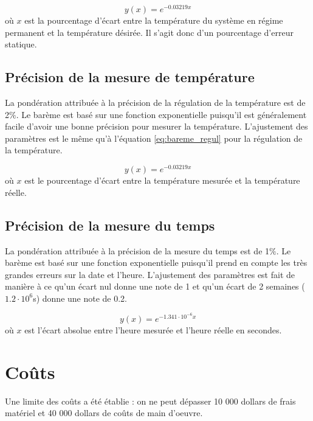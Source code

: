 \begin{equation}
    y(x) = e^{-0.03219x}
    \label{eq:bareme_regul}
\end{equation}
où $x$ est la pourcentage d'écart entre la température du système en régime permanent et la température désirée. Il s'agit donc d'un pourcentage d'erreur statique.

\subsection{Précision de la mesure de température}

La pondération attribuée à la précision de la régulation de la température est de 2$\%$. Le barème est basé sur une fonction exponentielle puisqu'il est généralement facile d'avoir une bonne précision pour mesurer la température. L'ajustement des paramètres est le même qu'à l'équation \ref{eq:bareme_regul} pour la régulation de la température.

\begin{equation}
    y(x) = e^{-0.03219x}
    \label{eq:bareme_precision_temperature}
\end{equation}
où $x$ est le pourcentage d'écart entre la température mesurée et la température réelle.

\subsection{Précision de la mesure du temps}

La pondération attribuée à la précision de la mesure du temps est de 1$\%$. Le barème est basé sur une fonction exponentielle puisqu'il prend en compte les très grandes erreurs sur la date et l'heure. L'ajustement des paramètres est fait de manière à ce qu'un écart nul donne une note de 1 et qu'un écart de 2 semaines ($1.2\cdot 10^6$s) donne une note de 0.2.

\begin{equation}
    y(x) = e^{-1.341\cdot10^{-6}x}
    \label{eq:bareme_precision_temps}
\end{equation}
où $x$ est l'écart absolue entre l'heure mesurée et l'heure réelle en secondes.

\section{Coûts}

Une limite des coûts a été établie : on ne peut dépasser 10 000 dollars de frais matériel et 40 000 dollars de coûts de main d'oeuvre. 

